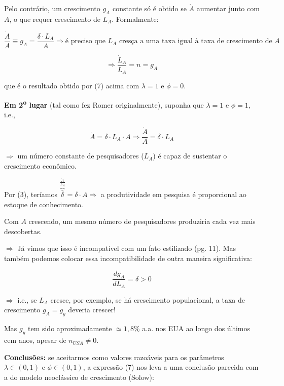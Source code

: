 \documentclass[a4paper,12pt]{article}[abntex2]
\begin{document}
Pelo contrário, um crescimento \( g_A \) constante só é obtido se \( \dot{A} \) aumentar junto com \( A \), o que requer crescimento de \( L_A \). Formalmente:

\[
\frac{\dot{A}}{A} \equiv g_A = \frac{\delta \cdot L_A}{A} \Rightarrow \text{é preciso que } L_A \text{ cresça a uma taxa igual à taxa de crescimento de } A
\]

\[
\Rightarrow \frac{\dot{L}_A}{L_A} = n = g_A
\]

que é o resultado obtido por (7) acima com \( \lambda = 1 \) e \( \phi = 0 \).

\begin{center}
\end{center}

\textbf{Em 2\textsuperscript{o} lugar} (tal como fez Romer originalmente), suponha que \( \lambda = 1 \) e \( \phi = 1 \), i.e.,

\[
\dot{A} = \delta \cdot L_A \cdot A \Rightarrow \frac{\dot{A}}{A} = \delta \cdot L_A
\]

\(\Rightarrow\) um número constante de pesquisadores (\( L_A \)) é capaz de sustentar o crescimento econômico.

Por (3), teríamos \( \overbrace{\bar{\delta}}^{\frac{\dot{A}}{L_A}} = \delta \cdot A \Rightarrow \) a produtividade em pesquisa é proporcional ao estoque de conhecimento. 

Com \( A \) crescendo, um mesmo número de pesquisadores produziria cada vez mais descobertas. 

\(\Rightarrow\) Já vimos que isso é incompatível com um fato estilizado (pg. 11). Mas também podemos colocar essa incompatibilidade de outra maneira significativa:

\[
\frac{d g_A}{d L_A} = \delta > 0
\]

\(\Rightarrow\) i.e., se \( L_A \) cresce, por exemplo, se há crescimento populacional, a taxa de crescimento \( g_A = g_y \) deveria crescer!

Mas \( g_y \) tem sido aproximadamente \( \simeq 1{,}8\% \) a.a. nos EUA ao longo dos últimos cem anos, apesar de \( n_{USA} \ne 0 \).

\textbf{Conclusões:} se aceitarmos como valores razoáveis para os parâmetros \( \lambda \in (0,1) \) e \( \phi \in (0,1) \), a expressão (7) nos leva a uma conclusão parecida com a do modelo neoclássico de crescimento (Solow): 
\end{document}
